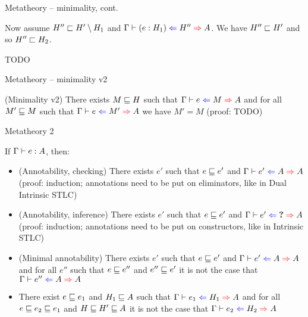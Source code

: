 \documentclass{beamer}
\begin{document}
\begin{frame}{Metatheory -- minimality, cont.}

Now assume $H'' \sqsubset H' \setminus H_1$ and $\hinting{\annot{e}{H_1}}{H''}{A}$. We have $H'' \sqsubset H'$ and so $H'' \sqsubset H_2$.

\vspace{2em}

TODO

\end{frame}

\begin{frame}{Metatheory -- minimality v2}

(Minimality v2) There exists $M \sqsubseteq H$ such that $\fullhinting{\Gamma}{e}{M}{A}$ and for all $M' \sqsubseteq M$ such that $\fullhinting{\Gamma}{e}{M'}{A}$ we have $M' = M$ (proof: TODO)

\vspace{1em}

\end{frame}

\begin{frame}{Metatheory 2}

If $\Gamma \vdash e : A$, then:

\begin{itemize}
  \item (Annotability, checking) There exists $e'$ such that $e \sqsubseteq e'$ and $\fullhinting{\Gamma}{e'}{A}{A}$ (proof: induction; annotations need to be put on eliminators, like in Dual Intrinsic STLC)
  \item (Annotability, inference) There exists $e'$ such that $e \sqsubseteq e'$ and $\fullhinting{\Gamma}{e'}{\Hole}{A}$ (proof: induction; annotations need to be put on constructors, like in Intrinsic STLC)
  \item (Minimal annotability) There exists $e'$ such that $e \sqsubseteq e'$ and $\fullhinting{\Gamma}{e'}{A}{A}$ and for all $e''$ such that $e \sqsubseteq e''$ and $e'' \sqsubseteq e'$ it is not the case that $\fullhinting{\Gamma}{e''}{A}{A}$
  \item There exist $e \sqsubseteq e_1$ and $H_1 \sqsubseteq A$ such that $\fullhinting{\Gamma}{e_1}{H_1}{A}$ and for all $e \sqsubseteq e_2 \sqsubseteq e_1$ and $H \sqsubseteq H' \sqsubseteq A$ it is not the case that $\fullhinting{\Gamma}{e_2}{H_2}{A}$
\end{itemize}

\end{frame}
\end{document}
